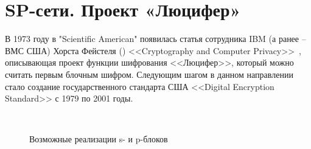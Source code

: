 \section{SP-сети. Проект «Люцифер»}\label{section-project-lucifer}

В 1973 году в \foreignlanguage{english}{"Scientific American"} появилась статья сотрудника IBM (а ранее -- ВМС США) Хорста Фейстеля () <<Cryptography and Computer Privacy>>~\cite{Feistel:1973}, описывающая проект функции шифрования <<Люцифер>>, который можно считать первым блочным шифром. Следующим шагом в данном направлении стало создание государственного стандарта США <<Digital Encryption Standard>> с 1979 по 2001 годы.

\begin{figure}[!t]
    \centering
    ~~~
		\caption{Возможные реализации s- и p-блоков}
\end{figure}

